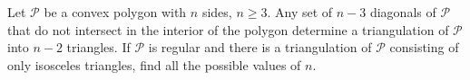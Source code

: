 Let $ \mathcal{P}$ be a convex polygon with $ n$ sides, $ n\ge3$. Any set of $ n - 3$ diagonals of $ \mathcal{P}$ that do not intersect in the interior of the polygon determine a triangulation of $ \mathcal{P}$ into $ n - 2$ triangles. If $ \mathcal{P}$ is regular and there is a triangulation of $ \mathcal{P}$ consisting of only isosceles triangles, find all the possible values of $ n$.